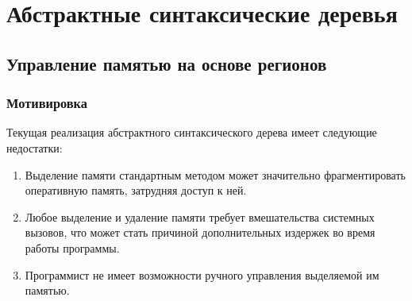 \documentclass[coursework]{SCWorks}
\begin{document}

\date{2023}

\maketitle


\tableofcontents




\section{Абстрактные синтаксические деревья}
\subsection{Управление памятью на основе регионов}

\subsubsection{Мотивировка}

Текущая реализация абстрактного синтаксического дерева имеет следующие недостатки:

\begin{enumerate}
	\item Выделение памяти стандартным методом может значительно фрагментировать оперативную память, затрудняя доступ к ней. 
	\item Любое выделение и удаление памяти требует вмешательства системных вызовов, что может стать причиной дополнительных издержек во время работы программы.
	\item Программист не имеет возможности ручного управления выделяемой им памятью.
\end{enumerate}
\end{document}
